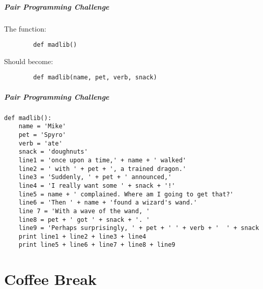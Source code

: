 \begin{frame}[fragile]
	\frametitle{Pair Programming Challenge}
	
	The function:

	\begin{lstlisting}
		def madlib()
	\end{lstlisting}
	
	\vspace{1.5em}
	
	Should become:
	
	\begin{lstlisting}
		def madlib(name, pet, verb, snack)
	\end{lstlisting}
	
\end{frame}


\begin{frame}[fragile]
	\frametitle{Pair Programming Challenge}
	
	\begin{lstlisting}
def madlib():
	name = 'Mike'
	pet = 'Spyro'
	verb = 'ate'
	snack = 'doughnuts'
	line1 = 'once upon a time,' + name + ' walked'
	line2 = ' with ' + pet + ', a trained dragon.'
	line3 = 'Suddenly, ' + pet + ' announced,'
	line4 = 'I really want some ' + snack + '!'
	line5 = name + ' complained. Where am I going to get that?'
	line6 = 'Then ' + name + 'found a wizard's wand.'
	line 7 = 'With a wave of the wand, '
	line8 = pet + ' got ' + snack + '. '
	line9 = 'Perhaps surprisingly, ' + pet + ' ' + verb + '  ' + snack
	print line1 + line2 + line3 + line4
	print line5 + line6 + line7 + line8 + line9

\end{lstlisting}
	
\end{frame}

\part{Coffee Break}





